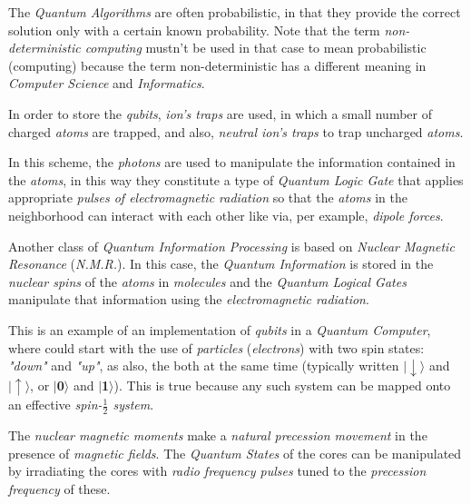 \documentclass[conference]{IEEEtran}
\begin{document}
\newpage

The \textit{Quantum Algorithms} are often probabilistic, in that they provide the correct solution only with a certain known probability. Note that the term \textit{non-deterministic computing} mustn't be used in that case to mean probabilistic (computing) because the term non-deterministic has a different meaning in \textit{Computer Science} and \textit{Informatics}.

\vspace{4pt}

In order to store the \textit{qubits}, \textit{ion's traps} are used, in which a small number of charged \textit{atoms} are trapped, and also, \textit{neutral ion's traps} to trap uncharged \textit{atoms}.

\vspace{4pt}

In this scheme, the \textit{photons} are used to manipulate the information contained in the \textit{atoms}, in this way they constitute a type of \textit{Quantum Logic Gate} that applies appropriate \textit{pulses of electromagnetic radiation} so that the \textit{atoms} in the neighborhood can interact with each other like via, per example, \textit{dipole forces}.

\vspace{4pt}

Another class of \textit{Quantum Information Processing} is based on \textit{Nuclear Magnetic Resonance} (\textit{N.M.R.}). In this case, the \textit{Quantum Information} is stored in the \textit{nuclear spins} of the \textit{atoms} in \textit{molecules} and the \textit{Quantum Logical Gates} manipulate that information using the \textit{electromagnetic radiation}.

\vspace{4pt}

This is an example of an implementation of \textit{qubits} in a \textit{Quantum Computer}, where could start with the use of \textit{particles} (\textit{electrons}) with two spin states: \textit{"down"} and \textit{"up"}, as also, the both at the same time (typically written \textbf{$\mid\downarrow\rangle$} and \textbf{$\mid\uparrow\rangle$}, or \textbf{$\mid$0$\rangle$} and \textbf{$\mid$1$\rangle$}). This is true because any such system can be mapped onto an effective \textit{spin-$\frac{1}{2}$ system}.

\vspace{4pt}

The \textit{nuclear magnetic moments} make a \textit{natural precession movement} in the presence of \textit{magnetic fields}. The \textit{Quantum States} of the cores can be manipulated by irradiating the cores with \textit{radio frequency pulses} tuned to the \textit{precession frequency} of these.
\end{document}

